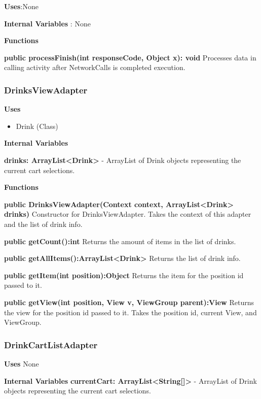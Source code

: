 \documentclass [10pt]{article}
\begin{document}
\textbf{Uses}:None

\textbf{Internal Variables} : None

\textbf{Functions}

\textbf{public processFinish(int responseCode, Object x): void}
Processes data in calling activity after NetworkCalls is completed execution.


\subsubsection{DrinksViewAdapter}

\textbf{Uses}

\begin{itemize}
	\item Drink (Class)
\end{itemize}

\textbf{Internal Variables}

\textbf{drinks: ArrayList<Drink>} - ArrayList of Drink objects representing the current cart selections.

\textbf{Functions}

\textbf{public DrinksViewAdapter(Context context, ArrayList<Drink> drinks)}
Constructor for DrinksViewAdapter. Takes the context of this adapter and the list of drink info.

\textbf{public getCount():int}
Returns the amount of items in the list of drinks.

\textbf{public getAllItems():ArrayList<Drink>}
Returns the list of drink info.

\textbf{public getItem(int position):Object}
Returns the item for the position id passed to it.

\textbf{public getView(int position, View v, ViewGroup parent):View}
Returns the view for the position id passed to it. Takes the position id, current View, and ViewGroup.


\subsubsection{DrinkCartListAdapter}

\textbf{Uses} None

\textbf{Internal Variables}
\textbf{currentCart: ArrayList<String[]>} - ArrayList of Drink objects representing the current cart selections.
\end{document}
